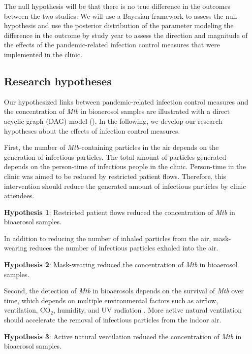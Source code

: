 \documentclass{article}
\newcommand{\forceindent}{\leavevmode{\parindent=1em\indent}}
\begin{document}
The null hypothesis will be that there is no true difference in the outcomes between the two studies. We will use a Bayesian framework to assess the null hypothesis and use the posterior distribution of the parameter modeling the difference in the outcome by study year to assess the direction and magnitude of the effects of the pandemic-related infection control measures that were implemented in the clinic. 

\subsection{Research hypotheses}

Our hypothesized links between pandemic-related infection control measures and the concentration of \emph{Mtb} in bioaerosol samples are illustrated with a direct acyclic graph (DAG) model (). In the following, we develop our research hypotheses about the effects of infection control measures. 

First, the number of \emph{Mtb}-containing particles in the air depends on the generation of infectious particles. The total amount of particles generated depends on the person-time of infectious people in the clinic. Person-time in the clinic was aimed to be reduced by restricted patient flows. Therefore, this intervention should reduce the generated amount of infectious particles by clinic attendees. \medskip

\forceindent \textbf{Hypothesis 1}: Restricted patient flows reduced the concentration of \emph{Mtb} in bioaerosol samples. \medskip

In addition to reducing the number of inhaled particles from the air, mask-wearing reduces the number of infectious particles exhaled into the air. \medskip

\forceindent \textbf{Hypothesis 2}: Mask-wearing reduced the concentration of \emph{Mtb} in bioaerosol samples. \medskip

Second, the detection of \emph{Mtb} in bioaerosols depends on the survival of \emph{Mtb} over time, which depends on multiple environmental factors such as airflow, ventilation, CO$_2$, humidity, and UV radiation \cite{Wang2021Science,Morawska2021,Haddrell2024NatCommun}. More active natural ventilation should accelerate the removal of infectious particles from the indoor air. \medskip

\forceindent \textbf{Hypothesis 3}: Active natural ventilation reduced the concentration of \emph{Mtb} in bioaerosol samples. \medskip
\end{document}
